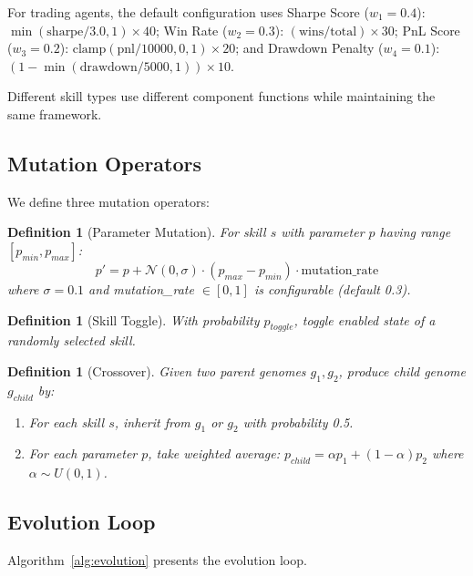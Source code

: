 \documentclass[conference]{IEEEtran}
\newtheorem{definition}[theorem]{Definition}
\begin{document}
For trading agents, the default configuration uses Sharpe Score ($w_1 = 0.4$): $\min(\text{sharpe}/3.0, 1) \times 40$; Win Rate ($w_2 = 0.3$): $(\text{wins}/\text{total}) \times 30$; PnL Score ($w_3 = 0.2$): $\text{clamp}(\text{pnl}/10000, 0, 1) \times 20$; and Drawdown Penalty ($w_4 = 0.1$): $(1 - \min(\text{drawdown}/5000, 1)) \times 10$.

Different skill types use different component functions while maintaining the same framework.

\subsection{Mutation Operators}

We define three mutation operators:

\begin{definition}[Parameter Mutation]
For skill $s$ with parameter $p$ having range $[p_{min}, p_{max}]$:
\begin{equation}
p' = p + \mathcal{N}(0, \sigma) \cdot (p_{max} - p_{min}) \cdot \text{mutation\_rate}
\end{equation}
where $\sigma = 0.1$ and mutation\_rate $\in [0, 1]$ is configurable (default 0.3).
\end{definition}

\begin{definition}[Skill Toggle]
With probability $p_{toggle}$, toggle enabled state of a randomly selected skill.
\end{definition}

\begin{definition}[Crossover]
Given two parent genomes $g_1, g_2$, produce child genome $g_{child}$ by:
\begin{enumerate}
    \item For each skill $s$, inherit from $g_1$ or $g_2$ with probability 0.5.
    \item For each parameter $p$, take weighted average: $p_{child} = \alpha p_1 + (1-\alpha) p_2$ where $\alpha \sim U(0, 1)$.
\end{enumerate}
\end{definition}

\subsection{Evolution Loop}

Algorithm~\ref{alg:evolution} presents the evolution loop.
\end{document}
